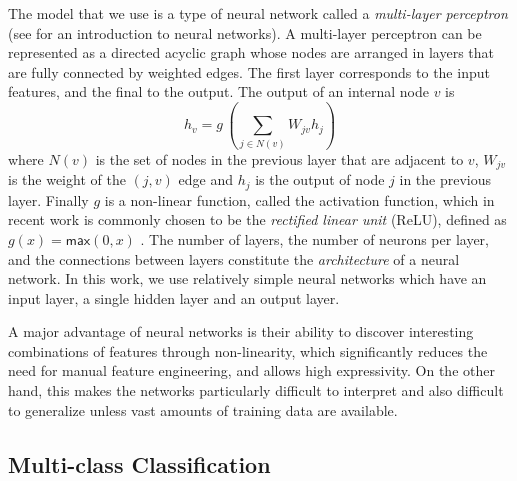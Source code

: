 

The model that we use is a type of neural network called a \emph{multi-layer
perceptron} (see \citealt{Nielsen2015-pu} for an introduction to neural
networks). A multi-layer perceptron can be represented as a directed acyclic
graph whose nodes are arranged in layers that are fully connected by weighted
edges. The first layer corresponds to the input features, and the final to the
output. The output of an internal node $v$ is
\[ h_v = g\,(\sum_{j \in N(v)}\!W_{jv} h_j ) \] where $N(v)$ is the set of nodes
in the previous layer that are adjacent to $v$, $W_{jv}$ is the weight of the
$(j, v)$ edge and $h_j$ is the output of node $j$ in the previous layer. Finally
$g$ is a non-linear function, called the activation function, which in recent
work is commonly chosen to be the \emph{rectified linear unit} (ReLU), defined
as $g(x) = \mathsf{max}(0,x)$ \citep{Nair2010-xg}. The number of layers, the
number of neurons per layer, and the connections between layers constitute the
\emph{architecture} of a neural network. In this work, we use relatively simple
neural networks which have an input layer, a single hidden layer and an output
layer.

A major advantage of neural networks is their ability to discover interesting
combinations of features through non-linearity, which significantly reduces the
need for manual feature engineering, and allows high expressivity. On the other
hand, this makes the networks particularly difficult to interpret and also
difficult to generalize unless vast amounts of training data are available.


\subsection{Multi-class Classification}
\label{subsec:multi-class}

